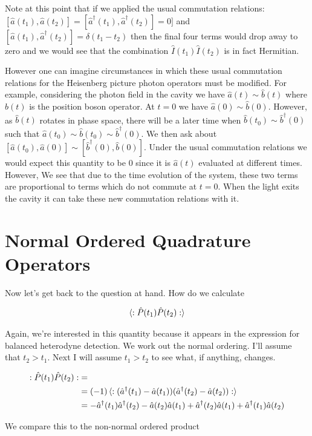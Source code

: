 \documentclass[12pt]{article}
\newcommand{\ahat}{\hat{a}}
\newcommand{\adag}{\ahat^{\dag}}
\begin{document}
Note at this point that if we applied the usual commutation relations: $[\hat{a}(t_1),\hat{a}(t_2)] = [\hat{a}^{\dag}(t_1),\hat{a}^{\dag}(t_2)] = 0]$ and $[\hat{a}(t_1),\hat{a}^{\dag}(t_2)] = \delta(t_1-t_2)$ then the final four terms would drop away to zero and we would see that the combination $\hat{I}(t_1)\hat{I}(t_2)$ is in fact Hermitian.

However one can imagine circumstances in which these usual commutation relations for the Heisenberg picture photon operators must be modified. For example, considering the photon field in the cavity we have $\hat{a}(t) \sim \hat{b}(t)$ where $\hat{b}(t)$ is the position boson operator. At $t=0$ we have $\hat{a}(0) \sim \hat{b}(0)$. However, as $\hat{b}(t)$ rotates in phase space, there will be a later time when $\hat{b}(t_0) \sim \hat{b}^{\dag}(0)$ such that $\hat{a}(t_0) \sim \hat{b}(t_0) \sim \hat{b}^{\dag}(0)$. We then ask about $[\hat{a}(t_0),\hat{a}(0)] \sim [\hat{b}^{\dag}(0),\hat{b}(0)]$. Under the usual commutation relations we would expect this quantity to be $0$ since it is $\hat{a}(t)$ evaluated at different times. However, We see that due to the time evolution of the system, these two terms are proportional to terms which do not commute at $t=0$. When the light exits the cavity it can take these new commutation relations with it.


\section{Normal Ordered Quadrature Operators}
Now let's get back to the question at hand. How do we calculate

\begin{align}
\braket{:\hat{P}(t_1)\hat{P}(t_2):}
\end{align}

Again, we're interested in this quantity because it appears in the expression for balanced heterodyne detection. We work out the normal ordering. I'll assume that $t_2>t_1$. Next I will assume $t_1>t_2$ to see what, if anything, changes.

\begin{align}
:\hat{P}(t_1)\hat{P}(t_2): &=\\
&= (-1)\braket{:(\adag(t_1)-\ahat(t_1))(\adag(t_2)-\ahat(t_2)):}\\
&=-\adag(t_1)\adag(t_2) - \ahat(t_2)\ahat(t_1) + \adag(t_2)\ahat(t_1)+\adag(t_1)\ahat(t_2)
\end{align}

We compare this to the non-normal ordered product
\end{document}
